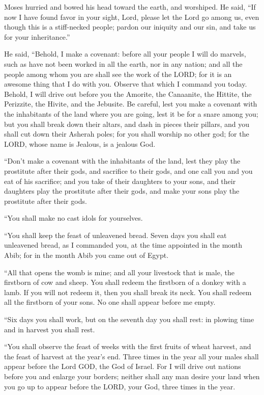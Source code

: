 \myverse{}Moses hurried and bowed his head toward the earth, and worshiped.
\myverse{}He said, “If now I have found favor in your sight, Lord, please let the Lord
go among us, even though this is a stiff-necked people; pardon our iniquity and our sin, and take us for
your inheritance.”


\myverse{}He said, “Behold, I make a covenant: before all your people
I will do marvels, such as have not been worked in all the earth, nor in any nation; and all the people
among whom you are shall see the work of the LORD; for it is an awesome thing that I do with you.
\myverse{}Observe that which I command you today. Behold, I will drive out before you
the Amorite, the Canaanite, the Hittite, the Perizzite, the Hivite, and the Jebusite.
\myverse{}Be careful, lest you make a covenant with the inhabitants of the land where
you are going, lest it be for a snare among you;
\myverse{}but you shall break down their altars, and dash in pieces their pillars,
and you shall cut down their Asherah poles;
\myverse{}for you shall worship no other god; for the LORD, whose name is Jealous,
is a jealous God.


\myverse{}“Don’t make a covenant with the inhabitants of the land, lest
they play the prostitute after their gods, and sacrifice to their gods, and one call you and you eat of
his sacrifice;
\myverse{}and you take of their daughters to your sons, and their daughters play the
prostitute after their gods, and make your sons play the prostitute after their gods.


\myverse{}“You shall make no cast idols for yourselves.


\myverse{}“You shall keep the feast of unleavened bread. Seven days you
shall eat unleavened bread, as I commanded you, at the time appointed in the month Abib; for in the month
Abib you came out of Egypt.


\myverse{}“All that opens the womb is mine; and all your livestock that
is male, the firstborn of cow and sheep.
\myverse{}You shall redeem the firstborn of a donkey with a lamb. If you will not redeem
it, then you shall break its neck. You shall redeem all the firstborn of your sons. No one shall appear
before me empty.


\myverse{}“Six days you shall work, but on the seventh day you shall rest:
in plowing time and in harvest you shall rest.


\myverse{}“You shall observe the feast of weeks with the first fruits
of wheat harvest, and the feast of harvest at the year’s end.
\myverse{}Three times in the year all your males shall appear before the Lord GOD,
the God of Israel.
\myverse{}For I will drive out nations before you and enlarge your borders; neither
shall any man desire your land when you go up to appear before the LORD, your God, three times in the
year.


